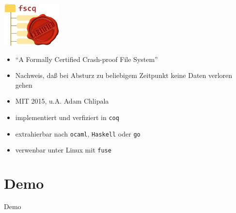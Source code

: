 \documentclass[aspectratio=169]{beamer}
\begin{document}
\begin{frame}
  \begin{center}
    \includegraphics[width=3.0cm]{fscq_logo.png}
  \end{center}
  \begin{itemize}
  \item ``A Formally Certified Crash-proof File System''
  \item Nachweis, daß bei Absturz zu beliebigem Zeitpunkt keine Daten verloren gehen
  \item MIT 2015, u.A. Adam Chlipala
  \item implementiert und verfiziert in \texttt{coq}
  \item extrahierbar nach \texttt{ocaml}, \texttt{Haskell} oder \texttt{go}
  \item verwenbar unter Linux mit \texttt{fuse} 
  \end{itemize}
\end{frame}
\section{Demo}
\begin{frame}
  \begin{center}
    \huge{Demo}
  \end{center}
\end{frame}
\end{document}
